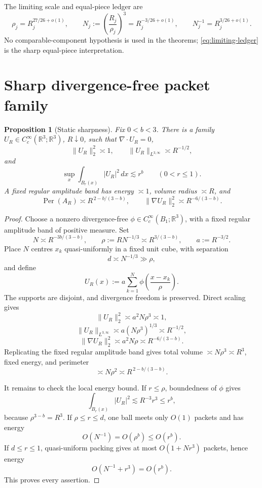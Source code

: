\documentclass[11pt]{article}
\newtheorem{proposition}[theorem]{Proposition}
\theoremstyle{remark}
\newcommand{\R}{\mathbb R}
\newcommand{\Per}{\operatorname{Per}}
\begin{document}
The limiting scale and equal-piece ledger are
\begin{equation}
 \label{eq:limiting-ledger}
 \rho_j=R_j^{27/26+o(1)},
 \qquad
 N_j:=\left(\frac{R_j}{\rho_j}\right)^3
 =R_j^{-3/26+o(1)},
 \qquad
 N_j^{-1}=R_j^{3/26+o(1)}.
\end{equation}
No comparable-component hypothesis is used in the theorems;
\eqref{eq:limiting-ledger} is the sharp equal-piece interpretation.

\section{Sharp divergence-free packet family}

\begin{proposition}[Static sharpness]
\label{prop:sharpness}
Fix \(0<b<3\).  There is a family
\(U_R\in C_c^\infty(\R^3;\R^3)\), \(R\downarrow0\), such that
\(\nabla\cdot U_R=0\),
\[
 \|U_R\|_2^2\asymp1,
 \qquad
 \|U_R\|_{L^{3,\infty}}\asymp R^{-1/2},
\]
and
\[
 \sup_x\int_{B_r(x)}|U_R|^2\,dx\lesssim r^b
 \qquad(0<r\le1).
\]
A fixed regular amplitude band has energy \(\asymp1\), volume radius
\(\asymp R\), and
\[
 \Per(A_R)\asymp R^{\,2-b/(3-b)},
 \qquad
 \|\nabla U_R\|_2^2\asymp R^{-6/(3-b)}.
\]
\end{proposition}

\begin{proof}
Choose a nonzero divergence-free
\(\phi\in C_c^\infty(B_1;\R^3)\), with a fixed regular amplitude band of
positive measure.  Set
\[
 N\asymp R^{-3b/(3-b)},
 \qquad
 \rho:=RN^{-1/3}\asymp R^{3/(3-b)},
 \qquad
 a:=R^{-3/2}.
\]
Place \(N\) centres \(x_k\) quasi-uniformly in a fixed unit cube, with
separation
\[
 d\asymp N^{-1/3}\gg\rho,
\]
and define
\begin{equation}
 \label{eq:packet-family}
 U_R(x):=
 a\sum_{k=1}^N
 \phi\left(\frac{x-x_k}{\rho}\right).
\end{equation}
The supports are disjoint, and divergence freedom is preserved.
Direct scaling gives
\[
 \|U_R\|_2^2
 \asymp a^2N\rho^3\asymp1,
\]
\[
 \|U_R\|_{L^{3,\infty}}
 \asymp a(N\rho^3)^{1/3}
 \asymp R^{-1/2},
\]
\[
 \|\nabla U_R\|_2^2
 \asymp a^2N\rho
 \asymp R^{-6/(3-b)}.
\]
Replicating the fixed regular amplitude band gives total volume
\(\asymp N\rho^3\asymp R^3\), fixed energy, and perimeter
\[
 \asymp N\rho^2
 \asymp R^{\,2-b/(3-b)}.
\]

It remains to check the local energy bound.  If \(r\le\rho\), boundedness
of \(\phi\) gives
\[
 \int_{B_r(x)}|U_R|^2
 \lesssim R^{-3}r^3\le r^b,
\]
because \(\rho^{3-b}=R^3\).  If \(\rho\le r\le d\), one ball meets only
\(O(1)\) packets and has energy
\[
 O(N^{-1})=O(\rho^b)\le O(r^b).
\]
If \(d\le r\le1\), quasi-uniform packing gives at most
\(O(1+Nr^3)\) packets, hence energy
\[
 O(N^{-1}+r^3)=O(r^b).
\]
This proves every assertion.
\end{proof}
\end{document}
